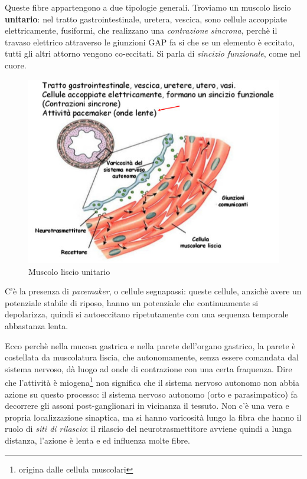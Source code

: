 \documentclass[a4paper,12pt]{article}
\begin{document}
Queste fibre appartengono a due tipologie generali. Troviamo un muscolo liscio \textbf{unitario}: nel tratto gastrointestinale, uretera, vescica, sono cellule accoppiate elettricamente, fusiformi, che realizzano una \emph{contrazione sincrona}, perchè il travaso elettrico attraverso le giunzioni GAP fa si che se un elemento è eccitato, tutti gli altri attorno vengono co-eccitati. Si parla di \emph{sincizio funzionale}, come nel cuore.
\begin{figure}[H]
\centering
\includegraphics[scale=0.4]{immagine/unitario.jpg}
\caption{Muscolo liscio unitario}
\end{figure}
C'è la presenza di \emph{pacemaker}, o cellule segnapassi: queste cellule, anzichè avere un potenziale stabile di riposo, hanno un potenziale che continuamente si depolarizza, quindi si autoeccitano ripetutamente con una sequenza temporale abbastanza lenta. 

Ecco perchè nella mucosa gastrica e nella parete dell'organo gastrico, la parete è costellata da muscolatura liscia, che autonomamente, senza essere comandata dal sistema nervoso, dà luogo ad onde di contrazione con una certa fraquenza. Dire che l'attività è miogena\footnote{origina dalle cellula muscolari} non significa che il sistema nervoso autonomo non abbia azione su questo processo: il sistema nervoso autonomo (orto e parasimpatico) fa decorrere gli assoni post-ganglionari in vicinanza il tessuto. Non c'è una vera e propria localizzazione sinaptica, ma si hanno varicosità lungo la fibra che hanno il ruolo di \emph{siti di rilascio}: il rilascio del neurotrasmettitore avviene quindi a lunga distanza, l'azione è lenta e ed influenza molte fibre. 
\end{document}
